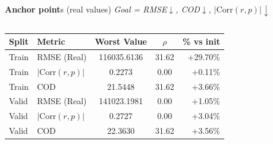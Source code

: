 \documentclass[aspectratio=169,10pt]{beamer}
\newcommand{\cRMSE}{blue!70!black}
\newcommand{\cCORR}{red!75!black}
\newcommand{\cCOD}{green!60!black}
\begin{document}
\begin{frame}{\frameK}
\begin{block}{  \footnotesize {} \textbf{Anchor point}s (real values) \;\; \textit{Goal = RMSE$\downarrow$, COD$\downarrow$, $|\mathrm{Corr}(r,p)|\downarrow$}}
\begin{columns}

\begin{tabular}{@{}ll S[table-format=6.4] S[table-format=2.2] r@{}}
\toprule
Split & Metric & \textbf{Worst Value} & {$\rho$} & {\% vs init} \\
\midrule
Train & \textcolor{\cRMSE}{RMSE (Real)}            & 116035.6136 & 31.62 & \textcolor{\cRMSE}{+29.70\%} \\
Train & \textcolor{\cCORR}{$|\mathrm{Corr}(r,p)|$} & 0.2273      & 0.00  & \textcolor{\cCORR}{+0.11\%} \\
Train & \textcolor{\cCOD}{COD}                     & 21.5448     & 31.62 & \textcolor{\cCOD}{+3.66\%} \\
\addlinespace[0.8mm]
Valid & \textcolor{\cRMSE}{RMSE (Real)}            & 141023.1981 & 0.00  & \textcolor{\cRMSE}{+1.05\%} \\
Valid & \textcolor{\cCORR}{$|\mathrm{Corr}(r,p)|$} & 0.2727      & 0.00  & \textcolor{\cCORR}{+3.04\%} \\
Valid & \textcolor{\cCOD}{COD}                     & 22.3630     & 31.62 & \textcolor{\cCOD}{+3.56\%} \\
\bottomrule
\end{tabular}

\end{columns}



\end{block}
\end{frame}
\end{document}
